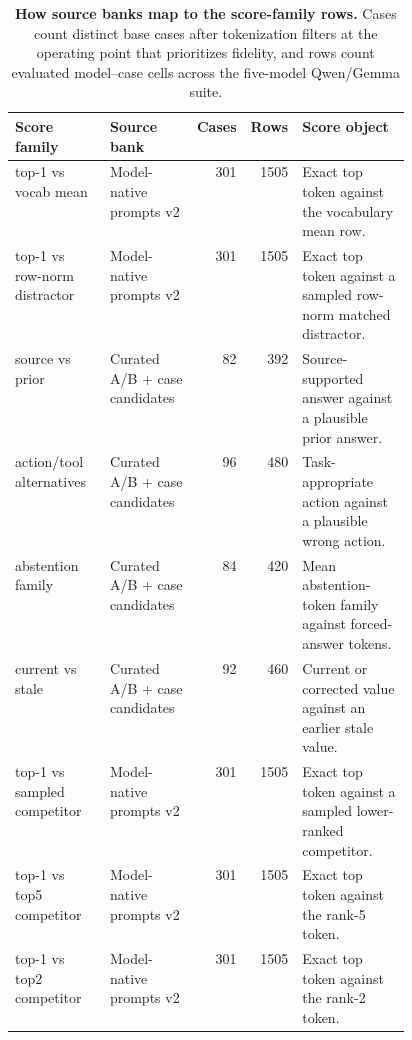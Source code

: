 \begin{table}[!tbp]
\caption{\textbf{How source banks map to the score-family rows.}
Cases count distinct base cases after tokenization filters at the
operating point that prioritizes fidelity, and rows count evaluated model--case cells
across the five-model Qwen/Gemma suite.}
\label{tab:app-query-family-provenance}
\centering
\footnotesize
\setlength{\tabcolsep}{3pt}
\begin{tabularx}{\linewidth}{@{}>{\RaggedRight\arraybackslash}p{0.24\linewidth}>{\RaggedRight\arraybackslash}p{0.22\linewidth}rrY@{}}
\toprule
Score family & Source bank & Cases & Rows & Score object \\
\midrule
top-1 vs vocab mean & Model-native prompts v2 & 301 & 1505 &
Exact top token against the vocabulary mean row. \\
top-1 vs row-norm distractor & Model-native prompts v2 & 301 & 1505 &
Exact top token against a sampled row-norm matched distractor. \\
source vs prior & Curated A/B + case candidates & 82 & 392 &
Source-supported answer against a plausible prior answer. \\
action/tool alternatives & Curated A/B + case candidates & 96 & 480 &
Task-appropriate action against a plausible wrong action. \\
abstention family & Curated A/B + case candidates & 84 & 420 &
Mean abstention-token family against forced-answer tokens. \\
current vs stale & Curated A/B + case candidates & 92 & 460 &
Current or corrected value against an earlier stale value. \\
top-1 vs sampled competitor & Model-native prompts v2 & 301 & 1505 &
Exact top token against a sampled lower-ranked competitor. \\
top-1 vs top5 competitor & Model-native prompts v2 & 301 & 1505 &
Exact top token against the rank-5 token. \\
top-1 vs top2 competitor & Model-native prompts v2 & 301 & 1505 &
Exact top token against the rank-2 token. \\
\bottomrule
\end{tabularx}
\end{table}

